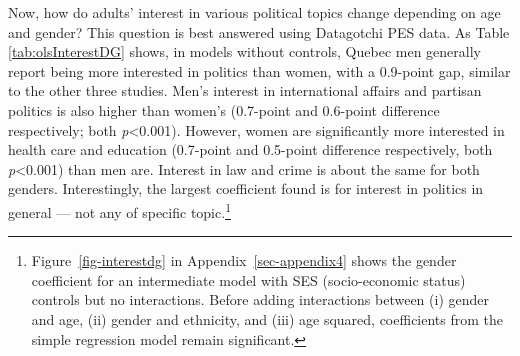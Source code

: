 \documentclass[
  letterpaper,
  DIV=11,
  numbers=noendperiod]{scrreprt}
\begin{document}
Now, how do adults' interest in various political topics change
depending on age and gender? This question is best answered using
Datagotchi PES data. As Table \ref{tab:olsInterestDG} shows, in models
without controls, Quebec men generally report being more interested in
politics than women, with a 0.9-point gap, similar to the other three
studies. Men's interest in international affairs and partisan politics
is also higher than women's (0.7-point and 0.6-point difference
respectively; both \emph{p}\textless0.001). However, women are
significantly more interested in health care and education (0.7-point
and 0.5-point difference respectively, both \emph{p}\textless0.001) than
men are. Interest in law and crime is about the same for both genders.
Interestingly, the largest coefficient found is for interest in politics
in general --- not any of specific topic.\footnote{Figure~\ref{fig-interestdg}
  in Appendix~\ref{sec-appendix4} shows the gender coefficient for an
  intermediate model with SES (socio-economic status) controls but no
  interactions. Before adding interactions between (i) gender and age,
  (ii) gender and ethnicity, and (iii) age squared, coefficients from
  the simple regression model remain significant.}
\end{document}
